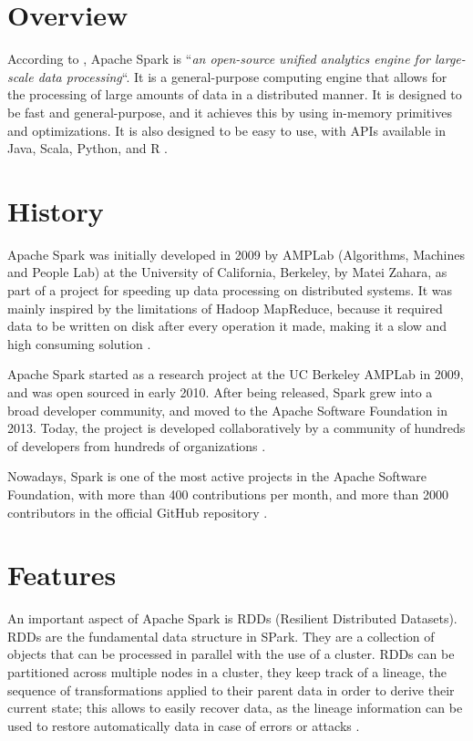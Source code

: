 \section{Overview}

According to \cite{wikipedia_spark}, Apache Spark is ``\emph{an open-source unified 
analytics engine for large-scale data processing}``. It is a general-purpose
computing engine that allows for the processing of large amounts of data in a
distributed manner. It is designed to be fast and general-purpose, and it
achieves this by using in-memory primitives and optimizations. It is also
designed to be easy to use, with APIs available in Java, Scala, Python, and R
\cite{openai_chatgpt}.

\section{History}

Apache Spark was initially developed in 2009 by AMPLab (Algorithms, Machines and
People Lab) at the University of California, Berkeley, by Matei Zahara, as part 
of a project for speeding up data processing on distributed systems. It was 
mainly inspired by the limitations of Hadoop MapReduce, because it required data
to be written on disk after every operation it made, making it a slow and high
consuming solution \cite{openai_chatgpt}.

Apache Spark started as a research project at the UC Berkeley AMPLab in 2009,
and was open sourced in early 2010.  After being released, Spark grew into a
broad developer community, and moved to the Apache Software Foundation in 2013.
Today, the project is developed collaboratively by a community of hundreds of
developers from hundreds of organizations \cite{apache_spark}.

Nowadays, Spark is one of the most active projects in the Apache Software 
Foundation, with more than 400 contributions per month, and more than 2000
contributors in the official GitHub repository \cite{repo_tracker}.

\section{Features}

An important aspect of Apache Spark is RDDs (Resilient Distributed Datasets).
RDDs are the fundamental data structure in SPark. They are a collection of
objects that can be processed in parallel with the use of a cluster. RDDs can be
partitioned across multiple nodes in a cluster, they keep track of a lineage,
the sequence of transformations applied to their parent data in order to derive
their current state; this allows to easily recover data, as the lineage
information can be used to restore automatically data in case of errors or
attacks \cite{openai_chatgpt}.

